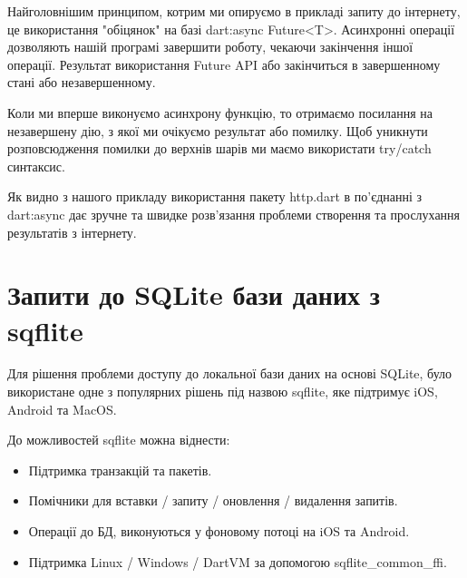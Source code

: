 Найголовнішим принципом, котрим ми опируємо в прикладі запиту до інтернету, це використання "обіцянок" на базі dart:async Future<T>.
Асинхронні операції дозволяють нашій програмі завершити роботу, чекаючи закінчення іншої операції.
Результат використання Future API або закінчиться в завершенному стані або незавершенному.

Коли ми вперше виконуємо асинхрону функцію, то отримаємо посилання на незавершену дію, з якої ми очікуємо результат або помилку.
Щоб уникнути розповсюдження помилки до верхнів шарів ми маємо використати try/catch синтаксис.

Як видно з нашого прикладу використання пакету http.dart в по'єднанні з dart:async дає зручне та швидке розв'язання проблеми створення та прослухання результатів з інтернету.


\section{Запити до SQLite бази даних з sqflite}
\label{section.3.4}
Для рішення проблеми доступу до локальної бази даних на основі SQLite,
було використане одне з популярних рішень під назвою sqflite, яке підтримує iOS, Android та MacOS.

До можливостей sqflite можна віднести:

\begin{itemize}
    \item Підтримка транзакцій та пакетів.
    \item Помічники для вставки / запиту / оновлення / видалення запитів.
    \item Операції до БД, виконуються у фоновому потоці на iOS та Android.
    \item Підтримка Linux / Windows / DartVM за допомогою sqflite_common_ffi.
\end{itemize}

